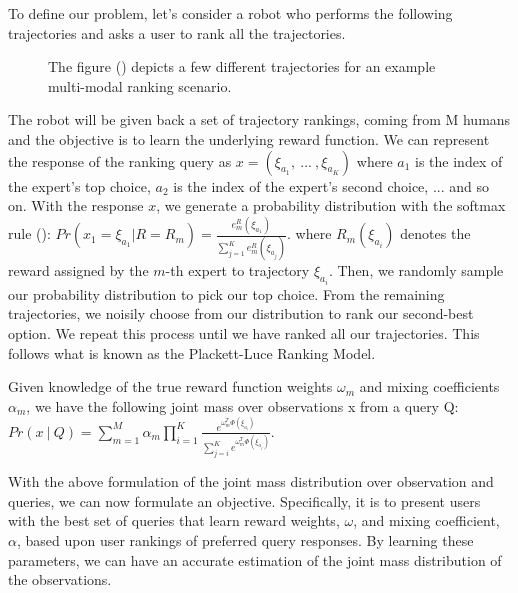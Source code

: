 \documentclass[
  letterpaper,
  numbers=noenddot,
  DIV=11]{scrreprt}
\theoremstyle{definition}
\theoremstyle{plain}
\theoremstyle{plain}
\theoremstyle{remark}
\begin{document}
To define our problem, let's consider a robot who performs the following
trajectories and asks a user to rank all the trajectories.

\begin{figure}


\caption{\label{fig-robot-traj}The figure
() depicts a few
different trajectories for an example multi-modal ranking scenario.}

\end{figure}%

The robot will be given back a set of trajectory rankings, coming from M
humans and the objective is to learn the underlying reward function. We
can represent the response of the ranking query as
\(x = (\xi_{a_1},\ ...\ ,\xi_{a_K})\) where \(a_1\) is the index of the
expert's top choice, \(a_2\) is the index of the expert's second choice,
... and so on. With the response \(x\), we generate a probability
distribution with the softmax rule
():
\(Pr(x_1 = \xi_{a_1} | R = R_m) = \frac{e^R_m(\xi_{a_1})}{\sum_{j=1}^Ke^R_m(\xi_{a_j})}\).
where \(R_m(\xi_{a_i})\) denotes the reward assigned by the \(m\)-th
expert to trajectory \(\xi_{a_i}\). Then, we randomly sample our
probability distribution to pick our top choice. From the remaining
trajectories, we noisily choose from our distribution to rank our
second-best option. We repeat this process until we have ranked all our
trajectories. This follows what is known as the Plackett-Luce Ranking
Model.

Given knowledge of the true reward function weights \(\omega_m\) and
mixing coefficients \(\alpha_m\), we have the following joint mass over
observations x from a query Q:
\(Pr(x\ |\ Q) = \sum_{m = 1}^M \alpha_m\prod_{i = 1}^K\frac{e^{\omega_m^T \Phi(\xi_{a_i})}}{\sum_{j = i}^K e^{\omega_m^T \Phi(\xi_{a_j})}}\).

With the above formulation of the joint mass distribution over
observation and queries, we can now formulate an objective.
Specifically, it is to present users with the best set of queries that
learn reward weights, \(\omega\), and mixing coefficient, \(\alpha\),
based upon user rankings of preferred query responses. By learning these
parameters, we can have an accurate estimation of the joint mass
distribution of the observations.
\end{document}
